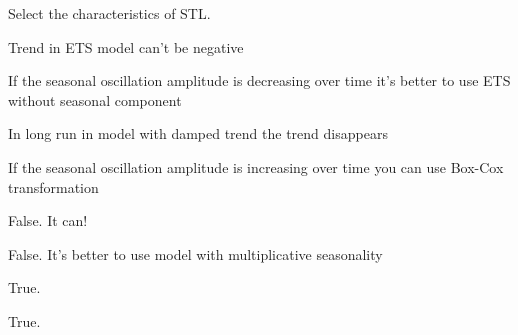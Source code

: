 
\begin{question}
Select the characteristics of STL.
\begin{answerlist}
  \item Trend in ETS model can't be negative
  \item If the seasonal oscillation amplitude is decreasing over time it's better to use ETS without seasonal component
  \item In long run in model with damped trend the trend disappears
  \item If the seasonal oscillation amplitude is increasing over time you can use Box-Cox transformation
\end{answerlist}
\end{question}

\begin{solution}
\begin{answerlist}
  \item False. It can!
  \item False. It's better to use model with multiplicative seasonality
  \item True.
  \item True.
\end{answerlist}
\end{solution}

